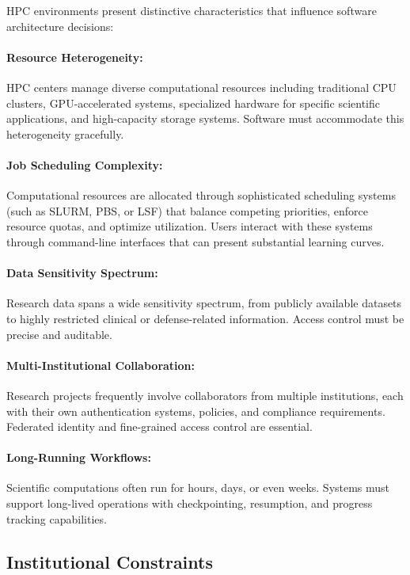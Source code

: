 HPC environments present distinctive characteristics that influence software architecture decisions:

\paragraph{Resource Heterogeneity:}
HPC centers manage diverse computational resources including traditional CPU clusters, GPU-accelerated systems, specialized hardware for specific scientific applications, and high-capacity storage systems. Software must accommodate this heterogeneity gracefully.

\paragraph{Job Scheduling Complexity:}
Computational resources are allocated through sophisticated scheduling systems (such as SLURM, PBS, or LSF) that balance competing priorities, enforce resource quotas, and optimize utilization. Users interact with these systems through command-line interfaces that can present substantial learning curves.

\paragraph{Data Sensitivity Spectrum:}
Research data spans a wide sensitivity spectrum, from publicly available datasets to highly restricted clinical or defense-related information. Access control must be precise and auditable.

\paragraph{Multi-Institutional Collaboration:}
Research projects frequently involve collaborators from multiple institutions, each with their own authentication systems, policies, and compliance requirements. Federated identity and fine-grained access control are essential.

\paragraph{Long-Running Workflows:}
Scientific computations often run for hours, days, or even weeks. Systems must support long-lived operations with checkpointing, resumption, and progress tracking capabilities.

\subsection{Institutional Constraints}

